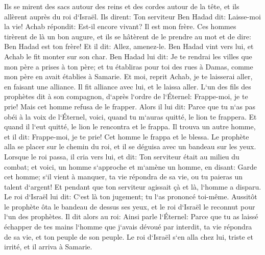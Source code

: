 \verse Ils se mirent des sacs autour des reins et des cordes autour de la tête, et ils allèrent auprès du roi d`Israël. Ils dirent: Ton serviteur Ben Hadad dit: Laisse-moi la vie! Achab répondit: Est-il encore vivant? Il est mon frère. 
\verse Ces hommes tirèrent de là un bon augure, et ils se hâtèrent de le prendre au mot et de dire: Ben Hadad est ton frère! Et il dit: Allez, amenez-le. Ben Hadad vint vers lui, et Achab le fit monter sur son char. 
\verse Ben Hadad lui dit: Je te rendrai les villes que mon père a prises à ton père; et tu établiras pour toi des rues à Damas, comme mon père en avait établies à Samarie. Et moi, reprit Achab, je te laisserai aller, en faisant une alliance. Il fit alliance avec lui, et le laissa aller. 
\verse L`un des fils des prophètes dit à son compagnon, d`après l`ordre de l`Éternel: Frappe-moi, je te prie! Mais cet homme refusa de le frapper. 
\verse Alors il lui dit: Parce que tu n`as pas obéi à la voix de l`Éternel, voici, quand tu m`auras quitté, le lion te frappera. Et quand il l`eut quitté, le lion le rencontra et le frappa. 
\verse Il trouva un autre homme, et il dit: Frappe-moi, je te prie! Cet homme le frappa et le blessa. 
\verse Le prophète alla se placer sur le chemin du roi, et il se déguisa avec un bandeau sur les yeux. 
\verse Lorsque le roi passa, il cria vers lui, et dit: Ton serviteur était au milieu du combat; et voici, un homme s`approche et m`amène un homme, en disant: Garde cet homme; s`il vient à manquer, ta vie répondra de sa vie, ou tu paieras un talent d`argent! 
\verse Et pendant que ton serviteur agissait çà et là, l`homme a disparu. Le roi d`Israël lui dit: C`est là ton jugement; tu l`as prononcé toi-même. 
\verse Aussitôt le prophète ôta le bandeau de dessus ses yeux, et le roi d`Israël le reconnut pour l`un des prophètes. 
\verse Il dit alors au roi: Ainsi parle l`Éternel: Parce que tu as laissé échapper de tes mains l`homme que j`avais dévoué par interdit, ta vie répondra de sa vie, et ton peuple de son peuple. 
\verse Le roi d`Israël s`en alla chez lui, triste et irrité, et il arriva à Samarie. 


